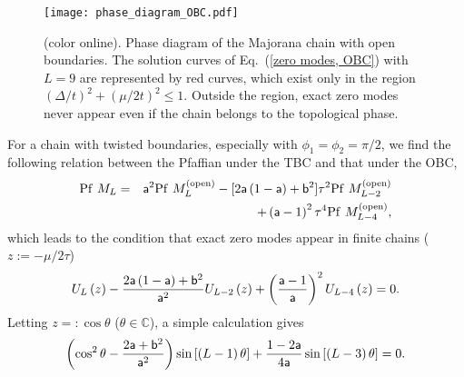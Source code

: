 \documentclass[aps, prb, showpacs, twocolumn, %
amssymb,superscriptaddress]{revtex4}
\begin{document}
\begin{figure}[t]
		\texttt{[image: phase\_diagram\_OBC.pdf]} 
      \caption{(color online). Phase diagram of the Majorana chain with open boundaries. The solution curves of Eq.~(\ref{zero modes, OBC}) with $L=9$ are represented by red curves, which exist only in the region $(\Delta/t)^2+(\mu/2t)^2\le1$. Outside the region, exact zero modes never appear even if the chain belongs to the topological phase. }
      \label{fig:phase diagram OBC}
\end{figure}


For a chain with twisted boundaries, especially with $\phi_{1} = \phi_{2} = \pi/2$, we find the following relation between the Pfaffian under the TBC and that under the OBC,
\begin{eqnarray}
\mathrm{Pf}~M_{L}
&=& {\sf a}^{2} \mathrm{Pf}~M_{L}^{\left( \mathrm{open} \right)}
-[ 2 {\sf a} \left( 1 - {\sf a} \right) + {\sf b}^{2}] \tau^{2} \mathrm{Pf}~M_{L-2}^{\left( \mathrm{open} \right)}\nonumber\\
&&+ \left( {\sf a} - 1 \right)^{2} \tau^{4} \mathrm{Pf}~M_{L-4}^{\left( \mathrm{open} \right)},
\end{eqnarray}
which leads to the condition that exact zero modes appear in finite chains ($z := -\mu/2\tau$)
\begin{equation}
U_{L} \left( z \right)
- \frac{2 {\sf a} \left( 1 - {\sf a} \right) + {\sf b}^{2}}{{\sf a}^{2}} U_{L-2} \left( z \right)
+ \left( \frac{{\sf a} - 1}{{\sf a}} \right)^{2} U_{L-4} \left( z \right) = 0.
\label{eq:pre_zeromode}
\end{equation}
Letting $z =: \cos \theta$ ($\theta \in \mathbb{C}$), a simple calculation gives
\begin{equation}\label{zeromode_condition}
\left( \cos^{2} \theta - \frac{2 {\sf a} + {\sf b}^{2}}{{\sf a}^{2}} \right) \sin \left[ \left( L-1 \right) \theta \right] + \frac{1-2 {\sf a}}{4 {\sf a}} \sin \left[ \left( L -3 \right) \theta \right] = 0.
\end{equation}
\end{document}
